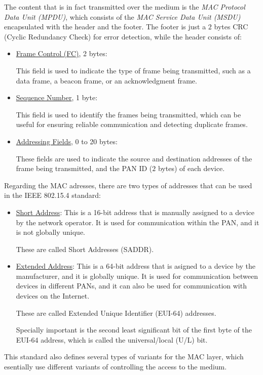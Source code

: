 The content that is in fact transmitted over the medium is the \emph{MAC Protocol Data Unit (MPDU)}, which consists of the \emph{MAC Service Data Unit (MSDU)} encapsulated with the header and the footer. The footer is just a $2$ bytes CRC (Cyclic Redundancy Check) for error detection, while the header consists of:
\begin{itemize}
    \item \ul{Frame Control (FC)}, 2 bytes:
    
    This field is used to indicate the type of frame being transmitted, such as a data frame, a beacon frame, or an acknowledgment frame.

    \item \ul{Sequence Number}, 1 byte:
    
    This field is used to identify the frames being transmitted, which can be useful for ensuring reliable communication and detecting duplicate frames.

    \item \ul{Addressing Fields}, 0 to 20 bytes:
    
    These fields are used to indicate the source and destination addresses of the frame being transmitted, and the PAN ID ($2$ bytes) of each device.
\end{itemize}

Regarding the MAC adresses, there are two types of addresses that can be used in the IEEE 802.15.4 standard:
\begin{itemize}
    \item \ul{Short Address}: This is a 16-bit address that is manually assigned to a device by the network operator. It is used for communication within the PAN, and it is not globally unique.
    
    These are called Short Addresses (SADDR).
    \item \ul{Extended Address}: This is a 64-bit address that is asigned to a device by the manufacturer, and it is globally unique. It is used for communication between devices in different PANs, and it can also be used for communication with devices on the Internet.
    
    These are called Extended Unique Identifier (EUI-64) addresses.

    Specially important is the second least significant bit of the first byte of the EUI-64 address, which is called the universal/local (U/L) bit.
\end{itemize}

This standard also defines several types of variants for the MAC layer, which esentially use different variants of controlling the access to the medium.

